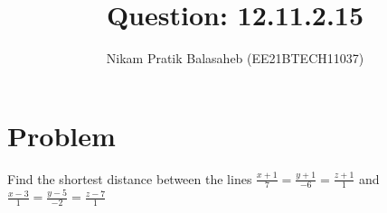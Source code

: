 \documentclass[journal,12pt,twocolumn]{IEEEtran}
\begin{document}
\vspace{3cm}


\title{Question: 12.11.2.15}
\author{Nikam Pratik Balasaheb (EE21BTECH11037)}





\maketitle

\newpage


\bigskip

\renewcommand{\thefigure}{\theenumi}
\renewcommand{\thetable}{\theenumi}

\section{Problem}
Find the shortest distance between the lines $\frac{x+1}{7} = \frac{y+1}{-6}=\frac{z+1}{1}$ and $\frac{x-3}{1} = \frac{y-5}{-2}=\frac{z-7}{1}$
\end{document}
